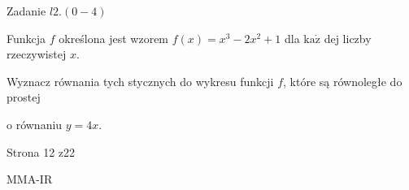\documentclass[a4paper,12pt]{article}
\begin{document}
Zadanie $l2. (0-4)$

Funkcja $f$ określona jest wzorem $f(x)=x^{3}-2x^{2}+1$ dla $\mathrm{k}\mathrm{a}\dot{\mathrm{z}}$ dej liczby rzeczywistej $x.$

Wyznacz równania tych stycznych do wykresu funkcji $f$, które są równoległe do prostej

o równaniu $y=4x.$

Strona 12 z22

MMA-IR
\end{document}
